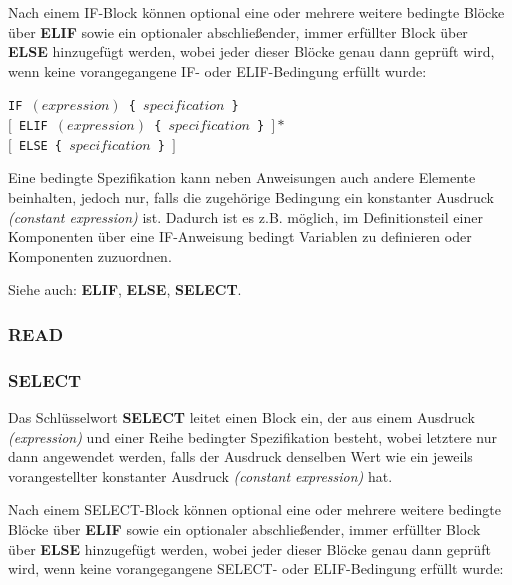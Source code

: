 \documentclass{scrartcl}
\begin{document}
\vspace{10pt}
\noindent Nach einem IF-Block können optional eine oder mehrere weitere bedingte Blöcke über \textbf{ELIF} sowie ein optionaler abschließender, immer erfüllter Block über \textbf{ELSE} hinzugefügt werden, wobei jeder dieser Blöcke genau dann geprüft wird, wenn keine vorangegangene IF- oder ELIF-Bedingung erfüllt wurde:

\vspace{10pt}
\indent \texttt{IF~$(expression)$ \{ $specification$ \}}\\
\indent \texttt{$[$~ELIF~$(expression)$ \{ $specification$ \}~$]*$}\\
\indent \texttt{$[$~ELSE \{ $specification$ \}~$]$}

\vspace{10pt}
\noindent Eine bedingte Spezifikation kann neben Anweisungen auch andere Elemente beinhalten, jedoch nur, falls die zugehörige Bedingung ein konstanter Ausdruck \textit{(constant expression)} ist. Dadurch ist es z.B. möglich, im Definitionsteil einer Komponenten über eine IF-Anweisung bedingt Variablen zu definieren oder Komponenten zuzuordnen.

\vspace{10pt}
\noindent Siehe auch: \textbf{ELIF}, \textbf{ELSE}, \textbf{SELECT}.

\subsubsection{READ}

\subsubsection{SELECT}

\noindent Das Schlüsselwort \textbf{SELECT} leitet einen Block ein, der aus einem Ausdruck \textit{(expression)} und einer Reihe bedingter Spezifikation besteht, wobei letztere nur dann angewendet werden, falls der Ausdruck denselben Wert wie ein jeweils vorangestellter konstanter Ausdruck \textit{(constant expression)} hat.

\vspace{10pt}
\noindent Nach einem SELECT-Block können optional eine oder mehrere weitere bedingte Blöcke über \textbf{ELIF} sowie ein optionaler abschließender, immer erfüllter Block über \textbf{ELSE} hinzugefügt werden, wobei jeder dieser Blöcke genau dann geprüft wird, wenn keine vorangegangene SELECT- oder ELIF-Bedingung erfüllt wurde:
\end{document}
